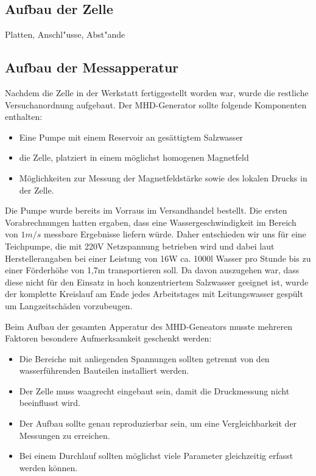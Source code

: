 \documentclass[11pt]{scrartcl}
\begin{document}
\subsection{Aufbau der Zelle}			%
Platten, Anschl"usse, Abst"ande

\subsection{Aufbau der Messapperatur}		%
Nachdem die Zelle in der Werkstatt fertiggestellt worden war, wurde die restliche Versuchanordnung aufgebaut. Der MHD-Generator sollte folgende Komponenten enthalten:

\begin{itemize}
	\item Eine Pumpe mit einem Reservoir an ges\"attigtem Salzwasser 
	\item die Zelle, platziert in einem m\"oglichst homogenen Magnetfeld 	
	\item M\"oglichkeiten zur Messung der Magnetfeldst\"arke sowie des lokalen Drucks in der Zelle.
\end{itemize}

Die Pumpe wurde bereits im Vorraus im Versandhandel bestellt. Die ersten Vorabrechnungen hatten ergaben, dass eine Wassergeschwindigkeit im Bereich von $1m/s$ messbare Ergebnisse liefern w\"urde. Daher entschieden wir uns f\"ur eine Teichpumpe, die mit 220V Netzspannung betrieben wird und dabei laut Herstellerangaben bei einer Leistung von 16W ca. 1000l Wasser pro Stunde bis zu einer F\"orderh\"ohe von 1,7m transportieren soll. Da davon auszugehen war, dass diese nicht f\"ur den Einsatz in hoch konzentriertem Salzwasser geeignet ist, wurde der komplette Kreislauf am Ende jedes Arbeitstages mit Leitungswasser gesp\"ult um Langzeitsch\"aden vorzubeugen.

Beim Aufbau der gesamten Apperatur des MHD-Geneators musste mehreren Faktoren besondere Aufmerksamkeit geschenkt werden: 
\begin{itemize}
	\item Die Bereiche mit anliegenden Spannungen sollten getrennt von den wasserf\"uhrenden Bauteilen installiert werden. 
	\item Der Zelle muss waagrecht eingebaut sein, damit die Druckmessung nicht beeinflusst wird.
	\item Der Aufbau sollte genau reproduzierbar sein, um eine Vergleichbarkeit der Messungen zu erreichen.
	\item Bei einem Durchlauf sollten m\"oglichst viele Parameter gleichzeitig erfasst werden k\"onnen.
\end{itemize} 
\end{document}
